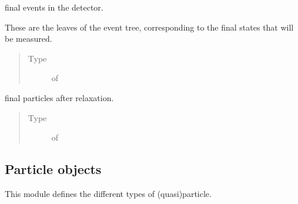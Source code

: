 \documentclass[letterpaper,10pt,english]{sphinxmanual}
\begin{document}
\begin{fulllineitems}

\begin{fulllineitems}
\label{\detokenize{code_structure:scdc.event.Event.leaf_events}}
final events in the detector.

These are the leaves of the event tree, corresponding to the final
states that will be measured.
\begin{quote}\begin{description}
\item[{Type}] \leavevmode
{} of {\hyperref[\detokenize{code_structure:scdc.event.Event}]{}}

\end{description}\end{quote}

\end{fulllineitems}


\begin{fulllineitems}
\label{\detokenize{code_structure:scdc.event.Event.leaf_particles}}
final particles after relaxation.
\begin{quote}\begin{description}
\item[{Type}] \leavevmode
{} of 

\end{description}\end{quote}

\end{fulllineitems}


\end{fulllineitems}



\subsection{Particle objects}
\label{\detokenize{code_structure:module-scdc.particle}}\label{\detokenize{code_structure:particle-objects}}
This module defines the different types of (quasi)particle.
\end{document}
